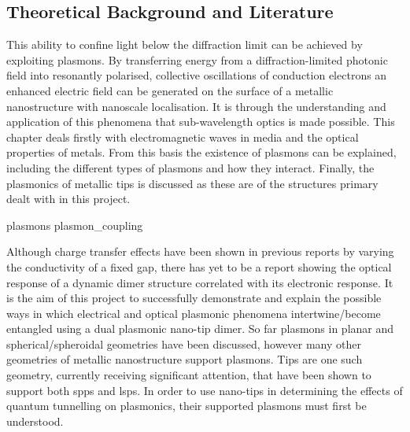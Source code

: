 \documentclass[12pt, a4paper, twoside]{book}
\begin{document}
\begin{singlespace}
{\color{white}
\chapter{Theoretical Background and Literature}}
\label{ch:theory}
\end{singlespace}


This ability to confine light below the diffraction limit can be achieved by exploiting plasmons. By transferring energy from a diffraction-limited photonic field into resonantly polarised, collective oscillations of conduction electrons an enhanced electric field can be generated on the surface of a metallic nanostructure with nanoscale localisation. It is through the understanding and application of this phenomena that sub-wavelength optics is made possible.
This chapter deals firstly with electromagnetic waves in media and the optical properties of metals. From this basis the existence of plasmons can be explained, including the different types of plasmons and how they interact. Finally, the plasmonics of metallic tips is discussed as these are of the structures primary dealt with in this project.

{plasmons}
{plasmon_coupling}

Although charge transfer effects have been shown in previous reports by varying the conductivity of a fixed gap, there has yet to be a report showing the optical response of a dynamic dimer structure correlated with its electronic response. It is the aim of this project to successfully demonstrate and explain the possible ways in which electrical and optical plasmonic phenomena {\color{red}intertwine/become entangled} using a dual plasmonic nano-tip dimer. So far plasmons in planar and {\color{red}spherical/spheroidal} geometries have been discussed, however many other geometries of metallic nanostructure support plasmons. Tips are one such geometry, currently receiving significant attention, that have been shown to support both \glspl{spp} and \glspl{lsp}. In order to use nano-tips in determining the effects of quantum tunnelling on plasmonics, their supported plasmons must first be understood.
\end{document}

